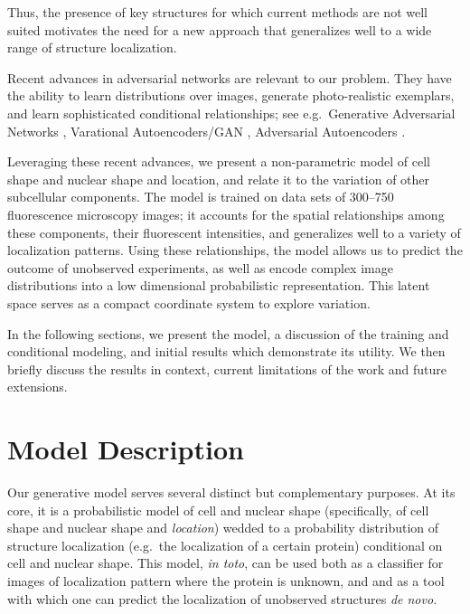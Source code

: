 \documentclass[accepted]{article}
\begin{document}
Thus, the presence of key structures for which current methods are not well suited motivates the need for a new approach that generalizes well to a wide range of structure localization.

Recent advances in adversarial networks \cite{Goodfellow:2014wp} are relevant to our problem.
They have the ability to learn distributions over images, generate photo-realistic exemplars, and learn sophisticated conditional relationships; see e.g.\ Generative Adversarial Networks \cite{Goodfellow:2014wp}, Varational Autoencoders/GAN \cite{Larsen:2015vi}, Adversarial Autoencoders \cite{Makhzani:2015tm}.

Leveraging these recent advances, we present a non-parametric model of cell shape and nuclear shape and location, and relate it to the variation of other subcellular components.
The model is trained on data sets of 300--750 fluorescence microscopy images; it accounts for the spatial relationships among these components, their fluorescent intensities, and generalizes well to a variety of localization patterns.
Using these relationships, the model allows us to predict the outcome of unobserved experiments, as well as encode complex image distributions into a low dimensional probabilistic representation.
This latent space serves as a compact coordinate system to explore variation.

In the following sections, we present the model, a discussion of the training and conditional modeling, and initial results which demonstrate its utility.
We then briefly discuss the results in context, current limitations of the work and future extensions.


\section{Model Description}
\label{description}

Our generative model serves several distinct but complementary purposes.
At its core, it is a probabilistic model of cell and nuclear shape (specifically, of cell shape and nuclear shape and \emph{location}) wedded to a probability distribution of structure localization (e.g.\ the localization of a certain protein) conditional on cell and nuclear shape.
This model, \emph{in toto}, can be used both as a classifier for images of localization pattern where the protein is unknown, and and as a tool with which one can predict the localization of unobserved structures \emph{de novo}.
\end{document}
